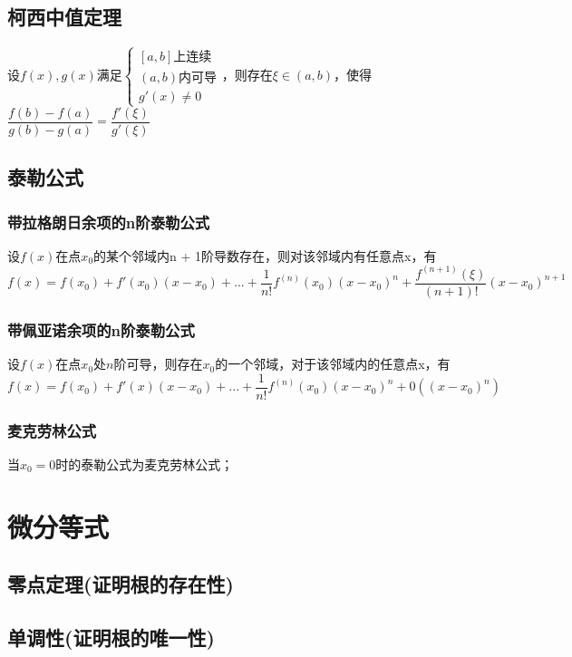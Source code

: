 \subsection{柯西中值定理}
设\(f(x), g(x)\)满足\(\begin{cases}
[a, b]\text{上连续} \\ 
(a, b)\text{内可导} \\ 
g'(x) \neq 0
\end{cases}\)，则存在\(\xi \in (a, b)\)，使得\(\dfrac{f(b) - f(a)}{g(b) - g(a)} = \dfrac{f'(\xi)}{g'(\xi)}\)

\subsection{泰勒公式}

\subsubsection{带拉格朗日余项的n阶泰勒公式}
设\(f(x)\)在点\(x_0\)的某个邻域内n + 1阶导数存在，则对该邻域内有任意点x，有\[f(x) = f(x_0) + f'(x_0)(x - x_0) + ... + \dfrac{1}{n!}f^{(n)}(x_0)(x - x_0)^n + \dfrac{f^{(n + 1)}(\xi)}{(n + 1)!}(x - x_0)^{n + 1}\]

\subsubsection{带佩亚诺余项的n阶泰勒公式}
设\(f(x)\)在点\(x_0\)处\(n\)阶可导，则存在\(x_0\)的一个邻域，对于该邻域内的任意点x，有\[f(x) = f(x_0) + f'(x)(x - x_0) + ... + \dfrac{1}{n!}f^{(n)}(x_0)(x - x_0)^n + 0((x - x_0)^n)\]

\subsubsection{麦克劳林公式}
当\(x_0 = 0\)时的泰勒公式为麦克劳林公式；


\section{微分等式}

\subsection{零点定理(证明根的存在性)}

\subsection{单调性(证明根的唯一性)}

